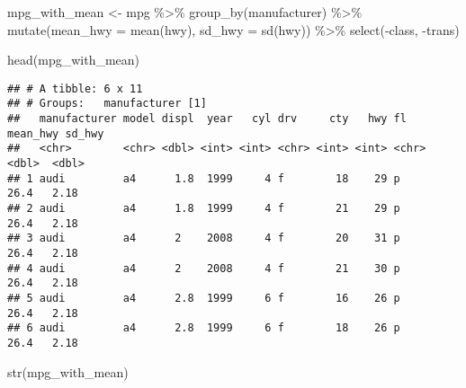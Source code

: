 \documentclass[
]{article}
\newenvironment{Shaded}{\begin{snugshade}}{\end{snugshade}}
\newcommand{\AttributeTok}[1]{\textcolor[rgb]{0.77,0.63,0.00}{#1}}
\newcommand{\FunctionTok}[1]{\textcolor[rgb]{0.00,0.00,0.00}{#1}}
\newcommand{\NormalTok}[1]{#1}
\newcommand{\OtherTok}[1]{\textcolor[rgb]{0.56,0.35,0.01}{#1}}
\newcommand{\SpecialCharTok}[1]{\textcolor[rgb]{0.00,0.00,0.00}{#1}}
\begin{document}
\begin{Shaded}
\begin{Highlighting}[]
\NormalTok{mpg\_with\_mean }\OtherTok{\textless{}{-}}\NormalTok{ mpg }\SpecialCharTok{\%\textgreater{}\%}
  \FunctionTok{group\_by}\NormalTok{(manufacturer) }\SpecialCharTok{\%\textgreater{}\%}
  \FunctionTok{mutate}\NormalTok{(}\AttributeTok{mean\_hwy =} \FunctionTok{mean}\NormalTok{(hwy), }\AttributeTok{sd\_hwy =} \FunctionTok{sd}\NormalTok{(hwy)) }\SpecialCharTok{\%\textgreater{}\%}
  \FunctionTok{select}\NormalTok{(}\SpecialCharTok{{-}}\NormalTok{class, }\SpecialCharTok{{-}}\NormalTok{trans)}

\FunctionTok{head}\NormalTok{(mpg\_with\_mean)}
\end{Highlighting}
\end{Shaded}

\begin{verbatim}
## # A tibble: 6 x 11
## # Groups:   manufacturer [1]
##   manufacturer model displ  year   cyl drv     cty   hwy fl    mean_hwy sd_hwy
##   <chr>        <chr> <dbl> <int> <int> <chr> <int> <int> <chr>    <dbl>  <dbl>
## 1 audi         a4      1.8  1999     4 f        18    29 p         26.4   2.18
## 2 audi         a4      1.8  1999     4 f        21    29 p         26.4   2.18
## 3 audi         a4      2    2008     4 f        20    31 p         26.4   2.18
## 4 audi         a4      2    2008     4 f        21    30 p         26.4   2.18
## 5 audi         a4      2.8  1999     6 f        16    26 p         26.4   2.18
## 6 audi         a4      2.8  1999     6 f        18    26 p         26.4   2.18
\end{verbatim}

\begin{Shaded}
\begin{Highlighting}[]
\FunctionTok{str}\NormalTok{(mpg\_with\_mean)}
\end{Highlighting}
\end{Shaded}
\end{document}

